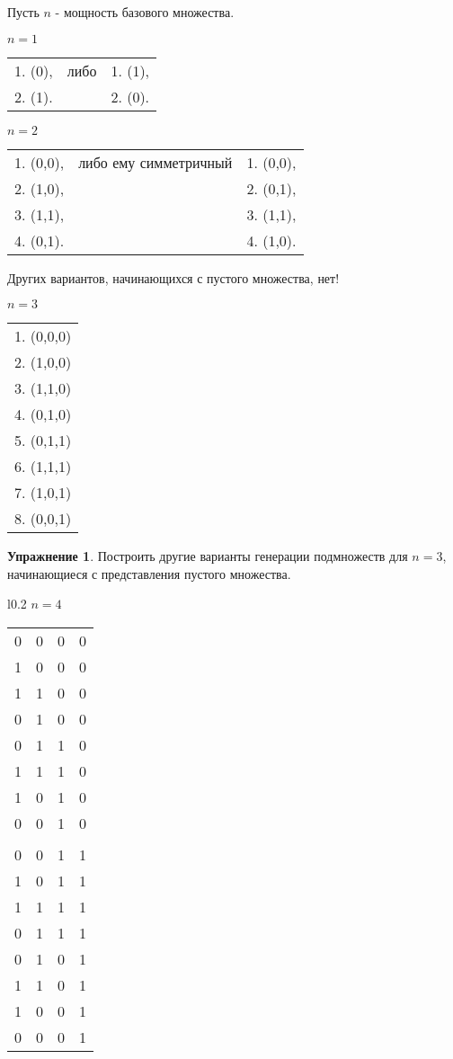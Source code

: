 \documentclass[12pt,a4paper]{article}
\theoremstyle{plain}
\theoremstyle{definition}
\newtheorem*{task}{Упражнение}
\theoremstyle{remark}
\begin{document}
Пусть $n$ - мощность базового множества.

$n=1$

\begin{tabular}{ccc}
1. (0), & либо & 1. (1), \\
2. (1). & & 2. (0).
\end{tabular}

$n=2$

\begin{tabular}{ccc}
1. (0,0), & либо ему симметричный & 1. (0,0), \\
2. (1,0), & & 2. (0,1), \\
3. (1,1), & & 3. (1,1), \\
4. (0,1). & & 4. (1,0). \\
\end{tabular}

Других вариантов, начинающихся с пустого множества, нет!

$n=3$

\begin{tabular}{c}
1. (0,0,0) \\
2. (1,0,0) \\
3. (1,1,0) \\
4. (0,1,0) \\
5. (0,1,1) \\
6. (1,1,1) \\
7. (1,0,1) \\
8. (0,0,1) \\
\end{tabular}

\begin{task}
Построить другие варианты генерации подмножеств для $n=3$, начинающиеся с представления пустого множества.
\end{task}

\begin{wraptable}{l}{0.2\textwidth}
$n=4$

\begin{tabular}{cccc}
0 & 0 & 0 & 0 \\
1 & 0 & 0 & 0 \\
1 & 1 & 0 & 0 \\
0 & 1 & 0 & 0 \\
0 & 1 & 1 & 0 \\
1 & 1 & 1 & 0 \\
1 & 0 & 1 & 0 \\
0 & 0 & 1 & 0 \\
\\
0 & 0 & 1 & 1 \\
1 & 0 & 1 & 1 \\
1 & 1 & 1 & 1 \\
0 & 1 & 1 & 1 \\
0 & 1 & 0 & 1 \\
1 & 1 & 0 & 1 \\
1 & 0 & 0 & 1 \\
0 & 0 & 0 & 1 \\
\end{tabular}
\end{wraptable}
\end{document}
